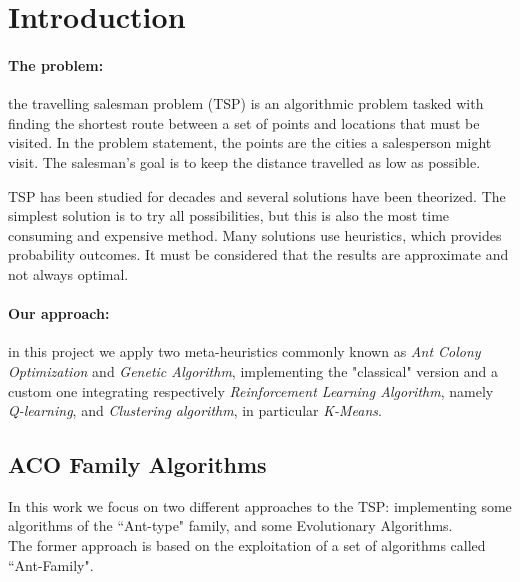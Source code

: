 \documentclass[10pt]{article}
\begin{document}
\newpage
\tableofcontents
\newpage
\section{Introduction}
\paragraph{The problem:}
the travelling salesman problem (TSP) is an algorithmic problem tasked with finding the shortest route between a set of points and locations that must be visited. 
In the problem statement, the points are the cities a salesperson might visit. The salesman's goal is to keep the distance travelled as low as possible. 

TSP has been studied for decades and several solutions have been theorized. 
The simplest solution is to try all possibilities, but this is also the most time consuming and expensive method. 
Many solutions use heuristics, which provides probability outcomes. 
It must be considered that the results are approximate and not always optimal. 
\paragraph{Our approach:}
in this project we apply two meta-heuristics commonly known as \textit{Ant Colony Optimization} and \textit{Genetic Algorithm}, implementing the "classical" version and a custom one integrating respectively \textit{Reinforcement Learning Algorithm}, namely \textit{Q-learning}, and \textit{Clustering algorithm}, in particular \textit{K-Means}.

\subsection{ACO Family Algorithms}
In this work we focus on two different approaches to the TSP: implementing some algorithms of the ``Ant-type" family, and some Evolutionary Algorithms.
\\The former approach is based on the exploitation of a set of algorithms called ``Ant-Family".
\end{document}
